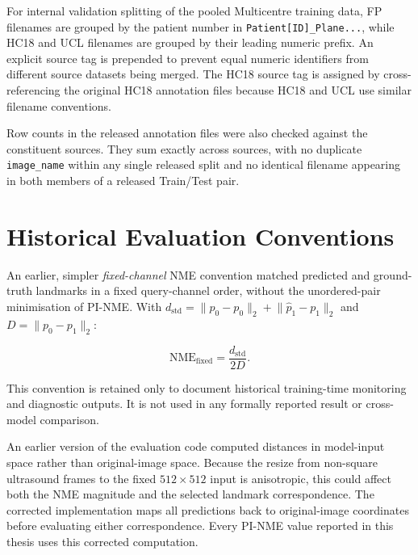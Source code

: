 For internal validation splitting of the pooled Multicentre training
data, FP filenames are grouped by the patient number in
\texttt{Patient[ID]\_Plane...}, while HC18 and UCL filenames are
grouped by their leading numeric prefix. An explicit source tag is
prepended to prevent equal numeric identifiers from different source
datasets being merged. The HC18 source tag is assigned by
cross-referencing the original HC18 annotation files because HC18 and
UCL use similar filename conventions.

Row counts in the released annotation files were also checked against
the constituent sources. They sum exactly across sources, with no
duplicate \texttt{image\_name} within any single released split and
no identical filename appearing in both members of a released
Train/Test pair.



\section{Historical Evaluation Conventions}
\label{app:historical-nme}

An earlier, simpler \emph{fixed-channel} NME convention matched
predicted and ground-truth landmarks in a fixed query-channel order,
without the unordered-pair minimisation of PI-NME. With
$d_{\text{std}} = \lVert \hat{p}_0 - p_0 \rVert_2 + \lVert
\hat{p}_1 - p_1 \rVert_2$ and $D = \lVert p_0 - p_1 \rVert_2$:

\begin{equation}
  \label{eq:nme-fetal-fixed}
  \mathrm{NME}_{\text{fixed}} = \frac{d_{\text{std}}}{2D}.
\end{equation}

This convention is retained only to document historical training-time
monitoring and diagnostic outputs. It is not used in any formally
reported result or cross-model comparison.

An earlier version of the evaluation code computed distances in
model-input space rather than original-image space. Because the
resize from non-square ultrasound frames to the fixed
$512 \times 512$ input is anisotropic, this could affect both the
NME magnitude and the selected landmark correspondence. The corrected
implementation maps all predictions back to original-image
coordinates before evaluating either correspondence. Every PI-NME
value reported in this thesis uses this corrected computation.


